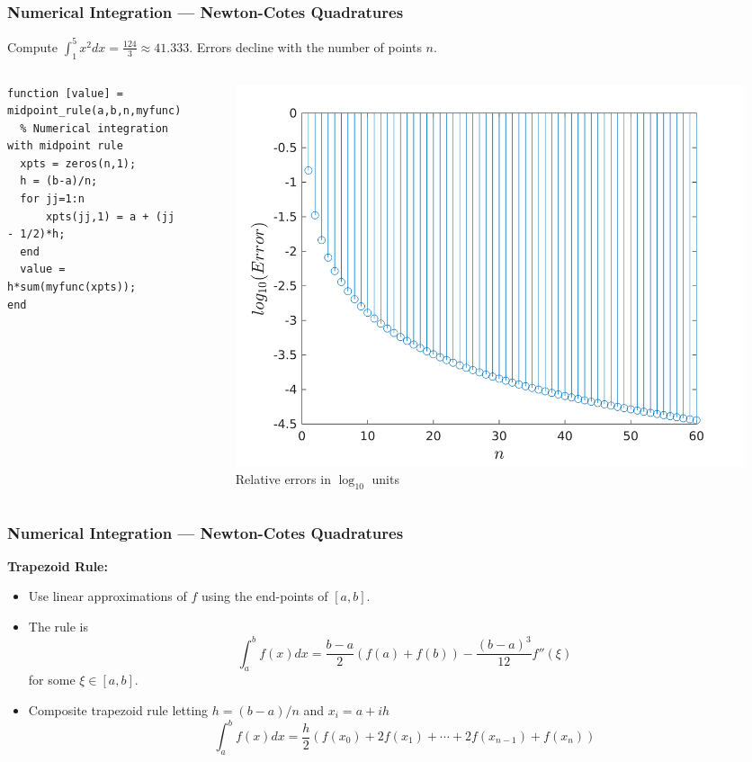 \documentclass[11pt,xcolor={svgnames},aspectratio=169,usepdftitle=false,notheorems]{beamer}
\begin{document}
\begin{frame}[fragile]
  \frametitle{Numerical Integration --- Newton-Cotes Quadratures}
\begin{example}
Compute $\int^5_1 x^2 dx = \frac{124}{3}\approx 41.333$. Errors decline with the number of points $n$.
\end{example}
\begin{columns}
\begin{column}{0.45\textwidth}
\begin{lstlisting}[basicstyle=\footnotesize\ttfamily]
function [value] = midpoint_rule(a,b,n,myfunc)
  % Numerical integration with midpoint rule
  xpts = zeros(n,1);
  h = (b-a)/n;
  for jj=1:n 
      xpts(jj,1) = a + (jj - 1/2)*h;
  end
  value = h*sum(myfunc(xpts));
end
\end{lstlisting}
\end{column}
\begin{column}{0.5\textwidth}
  \begin{figure}
    \centering
    \includegraphics[width=\textwidth]{../figures/errors_midpointrule.png}
    \caption{Relative errors in $\log_{10}$ units}
  \end{figure}
\end{column}
\end{columns}
\end{frame}

\begin{frame}
  \frametitle{Numerical Integration --- Newton-Cotes Quadratures}
  \alert{\textbf{Trapezoid Rule:}}
\begin{itemize}
  \item Use linear approximations of $f$ using the end-points of $[a,b]$.
  \item The rule is
  \[
  \int^b_a f(x)  dx = \frac{b-a}{2}(f(a) + f(b)) - \frac{(b - a)^3}{12}f''(\xi)
  \]
  for some $\xi\in [a,b]$.
  \item Composite trapezoid rule letting $h = (b-a)/n$ and $x_i = a + ih$
  \[
  \int^b_a f(x)dx = \frac{h}{2}\left(f(x_0) + 2f(x_1) + \cdots + 2f(x_{n-1}) + f(x_n)\right)
  \]
\end{itemize}
\end{frame}
\end{document}
